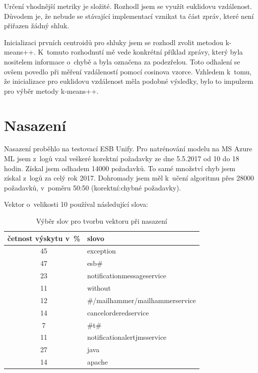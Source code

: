 \documentclass[thesis=M,czech]{FITthesis}[2012/10/20]
\begin{document}
			Určení vhodnější metriky je složité. Rozhodl jsem se využít euklidovu vzdálenost. Důvodem je, že nebude se stávající implementací vznikat ta část zpráv, které není přiřazen žádný shluk.
			
			Inicializaci prvních centroidů pro shluky jsem se rozhodl zvolit metodou k-means++. K~tomuto rozhodnutí mě vede konkrétní příklad  zprávy, který byla nositelem informace o~chybě a byla označena za podezřelou. Toto odhalení se ovšem povedlo při měření vzdáleností pomocí cosinova vzorce. Vzhledem k~tomu, že inicializace pro euklidovu vzdálenost měla podobné výsledky, bylo to impulzem pro výběr metody k-means++.
			
		\section{Nasazení}
			Nasazení proběhlo na testovací ESB Unify. Pro natrénování modelu na MS Azure ML jsem z~logů vzal veškeré korektní požadavky ze dne 5.5.2017 od 10 do 18 hodin. Získal jsem odhadem 14000 požadavků. To samé množství chyb jsem získal z~logů za celý rok 2017. Dohromady jsem měl k~učení algoritmu přes 28000 požadavků, v~poměru 50:50 (korektní:chybné požadavky).
			
			Vektor o~velikosti 10 používal následující slova:
			
			\begin{table}[htb]\centering
				\centering
				\caption{Výběr slov pro tvorbu vektoru při nasazení}
				\label{tab:vector-real}
				\begin{tabular}{|c|l|}
					\hline
					\textbf{četnost výskytu v~\%} & \textbf{slovo} \\ \hline
					45                            & exception   \\ \hline
					47                            & esb\#   \\ \hline
					23                            & notificationmessageservice     \\ \hline
					11                            & without     \\ \hline
					12                            & \#/mailhammer/mailhammerservice     \\ \hline
					14                            & cancelorderedservice     \\ \hline
					7                            & \#t\# \\ \hline
					11                            & notificationalertjmsservice  \\ \hline
					27                            & java   \\ \hline
					14                           & apache \\ \hline
				\end{tabular}
			\end{table}
			
\end{document}

